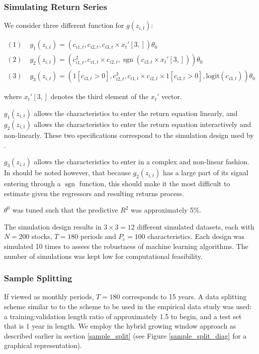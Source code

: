 \documentclass[11pt, a4paper, table]{article}
\begin{document}
\subsubsection{Simulating Return Series}

We consider three different function for $g(z_{i, t})$:

\begin{align}
(1)\; & g_1 \left(z_{i, t}\right)=\left(c_{i 1, t}, c_{i 2, t}, c_{i 3, t} \times x_{t}'[3,]\right) \theta_{0} \\
(2)\; & g_2 \left(z_{i, t}\right)=\left(c_{i 1, t}^{2}, c_{i 1, t} \times c_{i 2, t}, \operatorname{sgn}\left(c_{i 3, t} \times  x_{t}'[3,]\right)\right) \theta_{0} \\
(3)\; & g_3 \left(z_{i, t}\right) = \left(1[c_{i3,t}>0],c_{i 2, t}^{3}, c_{i 1, t} \times c_{i 2, t}\times 1[c_{i3,t}>0], \text{logit}\left({c}_{i 3, t} \right)\right) \theta_{0}
\end{align}

where $x_{t}'[3,]$ denotes the third element of the $x_{t}'$ vector.

$g_1 \left(z_{i, t}\right)$ allows the characteristics to enter the return equation linearly, and $g_2 \left(z_{i, t}\right)$ allows the characteristics to enter the return equation interactively and non-linearly. These two specifications correspond to the simulation design used by \cite{gu_empirical_2018}. 

$g_3 \left(z_{i, t}\right)$ allows the characteristics to enter in a complex and non-linear fashion. In should be noted however, that because $g_2 \left(z_{i, t}\right)$ has a large part of its signal entering through a $\operatorname{sgn}$ function, this should make it the most difficult to estimate given the regressors and resulting returns process.

$\theta^0$ was tuned such that the predictive $R^2$ was approximately 5\%.

The simulation design results in $3 \times 3 = 12$ different simulated datasets, each with $N = 200$ stocks, $T = 180$ periods and $P_c = 100$ characteristics. Each design was simulated 10 times to assess the robustness of machine learning algorithms. The number of simulations was kept low for computational feasibility.

\subsubsection{Sample Splitting}

If viewed as monthly periods, $T = 180$ corresponds to 15 years. A data splitting scheme similar to to the scheme to be used in the empirical data study was used: a training:validation length ratio of approximately 1.5 to begin, and a test set that is 1 year in length. We employ the hybrid growing window approach as described earlier in section \ref{sample_split} (see Figure \ref{sample_split_diag} for a graphical representation).
\end{document}
